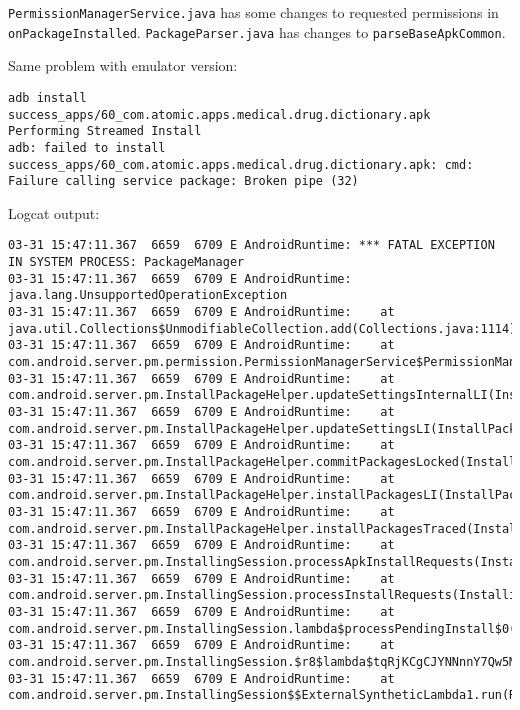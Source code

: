 \texttt{PermissionManagerService.java} has some changes to requested permissions in \texttt{onPackageInstalled}. \texttt{PackageParser.java} has changes to \texttt{parseBaseApkCommon}.

Same problem with emulator version:
\begin{lstlisting}
adb install success_apps/60_com.atomic.apps.medical.drug.dictionary.apk 
Performing Streamed Install
adb: failed to install success_apps/60_com.atomic.apps.medical.drug.dictionary.apk: cmd: Failure calling service package: Broken pipe (32)    
\end{lstlisting}

Logcat output:
\begin{lstlisting}
03-31 15:47:11.367  6659  6709 E AndroidRuntime: *** FATAL EXCEPTION IN SYSTEM PROCESS: PackageManager
03-31 15:47:11.367  6659  6709 E AndroidRuntime: java.lang.UnsupportedOperationException
03-31 15:47:11.367  6659  6709 E AndroidRuntime: 	at java.util.Collections$UnmodifiableCollection.add(Collections.java:1114)
03-31 15:47:11.367  6659  6709 E AndroidRuntime: 	at com.android.server.pm.permission.PermissionManagerService$PermissionManagerServiceInternalImpl.onPackageInstalled(PermissionManagerService.java:706)
03-31 15:47:11.367  6659  6709 E AndroidRuntime: 	at com.android.server.pm.InstallPackageHelper.updateSettingsInternalLI(InstallPackageHelper.java:2370)
03-31 15:47:11.367  6659  6709 E AndroidRuntime: 	at com.android.server.pm.InstallPackageHelper.updateSettingsLI(InstallPackageHelper.java:2165)
03-31 15:47:11.367  6659  6709 E AndroidRuntime: 	at com.android.server.pm.InstallPackageHelper.commitPackagesLocked(InstallPackageHelper.java:2134)
03-31 15:47:11.367  6659  6709 E AndroidRuntime: 	at com.android.server.pm.InstallPackageHelper.installPackagesLI(InstallPackageHelper.java:1031)
03-31 15:47:11.367  6659  6709 E AndroidRuntime: 	at com.android.server.pm.InstallPackageHelper.installPackagesTraced(InstallPackageHelper.java:915)
03-31 15:47:11.367  6659  6709 E AndroidRuntime: 	at com.android.server.pm.InstallingSession.processApkInstallRequests(InstallingSession.java:540)
03-31 15:47:11.367  6659  6709 E AndroidRuntime: 	at com.android.server.pm.InstallingSession.processInstallRequests(InstallingSession.java:529)
03-31 15:47:11.367  6659  6709 E AndroidRuntime: 	at com.android.server.pm.InstallingSession.lambda$processPendingInstall$0(InstallingSession.java:288)
03-31 15:47:11.367  6659  6709 E AndroidRuntime: 	at com.android.server.pm.InstallingSession.$r8$lambda$tqRjKCgCJYNNnnY7Qw5M5BHLup8(InstallingSession.java:0)
03-31 15:47:11.367  6659  6709 E AndroidRuntime: 	at com.android.server.pm.InstallingSession$$ExternalSyntheticLambda1.run(R8$$SyntheticClass:0)

\end{lstlisting}
